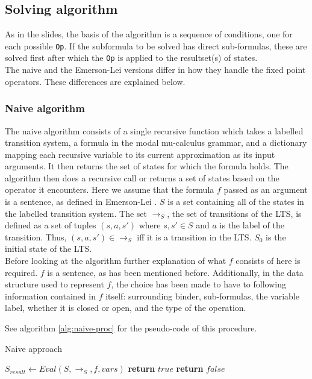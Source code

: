 \documentclass[10pt,a4paper]{article}
\begin{document}
\subsection{Solving algorithm}
As in the slides, the basis of the algorithm is a sequence of conditions, one for each possible \texttt{Op}. If the subformula to be solved has direct sub-formulas, these are solved first after which the \texttt{Op} is applied to the resultset(s) of states.\\
The naive and the Emerson-Lei versions differ in how they handle the fixed point operators. These differences are explained below.

\subsubsection{Naive algorithm}
The naive algorithm consists of a single recursive function which takes a labelled transition system, a formula in the modal mu-calculus grammar, and a dictionary mapping each recursive variable to its current approximation as its input arguments. It then returns the set of states for which the formula holds. The algorithm then does a recursive call or returns a set of states based on the operator it encounters. Here we assume that the formula $f$ passed as an argument is a sentence, as defined in Emerson-Lei \cite{elpaper}. $S$ is a set containing all of the states in the labelled transition system. The set $\to_S$, the set of transitions of the LTS, is defined as a set of tuples $(s,a,s\prime)$ where $s,s\prime \in S$ and $a$ is the label of the transition. Thus, $(s,a,s\prime) \in \to_S$ iff it is a transition in the LTS. $S_0$ is the initial state of the LTS.\\

Before looking at the algorithm further explanation of what $f$ consists of here is required. $f$ is a sentence, as has been mentioned before. Additionally, in the data structure used to represent $f$, the choice has been made to have to following information contained in $f$ itself: surrounding binder, sub-formulas, the variable label, whether it is closed or open, and the type of the operation. 

See algorithm \ref{alg:naive-proc} for the pseudo-code of this procedure.

\begin{algorithm}[H]
\caption{Naive approach}\label{alg:naive-proc}
\begin{algorithmic}[1]
	\State $S_{result} \gets Eval(S, \to_S,f, vars)$
        	\State \textbf{return} $true$ 
        \Else
			\State \textbf{return} $false$ 
		\EndIf
	\EndProcedure
\end{algorithmic}
\end{algorithm}
\end{document}
